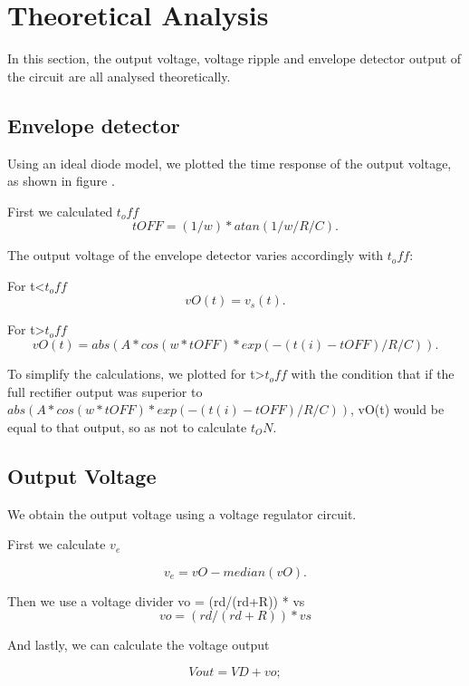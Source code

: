\section{Theoretical Analysis}
\label{sec:analysis}

In this section, the output voltage, voltage ripple and envelope detector output of the circuit are all analysed theoretically.

\subsection{Envelope detector}

Using an ideal diode model, we plotted the time response of the output voltage, as shown in figure .

First we calculated $t_off$
\begin{equation}
  tOFF = (1/w) * atan(1/w/R/C).
  \label{eq:menor toff}
\end{equation}

The output voltage of the envelope detector varies accordingly with $t_off$:

For t<$t_off$
\begin{equation}
  vO(t) = v_s(t).
  \label{eq:menor toff}
\end{equation}

For t>$t_off$
\begin{equation}
  vO(t) = abs(A*cos(w*tOFF)*exp(-(t(i)-tOFF)/R/C)).
  \label{eq:maior toff}
\end{equation}

To simplify the calculations, we plotted for t>$t_off$ with the condition that if the full rectifier output was superior to $abs(A*cos(w*tOFF)*exp(-(t(i)-tOFF)/R/C))$, vO(t) would be equal to that output, so as not to calculate $t_ON$.

\subsection{Output Voltage}

We obtain the output voltage using a voltage regulator circuit.

First we calculate $v_e$ 

\begin{equation}
  v_e = vO-median(vO).
  \label{eq:ve}
\end{equation}

Then we use a voltage divider
vo = (rd/(rd+R)) * vs
\begin{equation}
  vo = (rd/(rd+R)) * vs
  \label{eq:vo}
\end{equation}

And lastly, we can calculate the voltage output

\begin{equation}
  Vout = VD + vo;
  \label{eq:Vout}
\end{equation}
